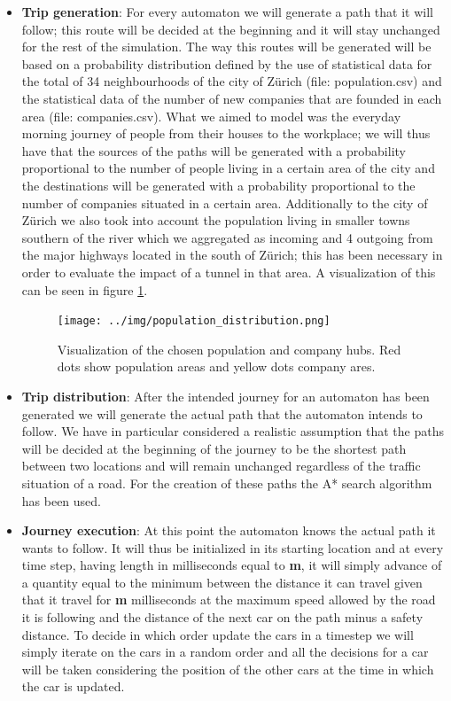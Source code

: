 \documentclass[11pt]{article}
\begin{document}
\begin{itemize}
\item \textbf{Trip generation}: For every automaton we will generate a path that it will follow; this route will be decided at the beginning and it will stay unchanged for the rest of the simulation. The way this routes will be generated will be based on a probability distribution defined by the use of statistical data\cite{ wiki:zurich} for the total of 34 neighbourhoods of the city of Z\"urich (file: population.csv) and the statistical data \cite{moneyhouse} of the number of new companies that are founded in each area (file: companies.csv). What we aimed to model was the everyday morning journey of people from their houses to the workplace; we will thus have that the sources of the paths will be generated with a probability proportional to the number of people living in a certain area of the city and the destinations will be generated with a probability proportional to the number of companies situated in a certain area. Additionally to the city of Z\"urich we also took into account the population living in smaller towns southern of the river which we aggregated as incoming and 4 outgoing from the major highways located in the south of Z\"urich; this has been necessary in order to evaluate the impact of a tunnel in that area.
A visualization of this can be seen in figure \ref{fig:pop_data}.

\begin{figure}[tbh]
	\begin{center}
		\texttt{[image: ../img/population\_distribution.png]}
	\end{center}
	\caption{Visualization of the chosen population and company hubs. Red dots show population areas and yellow dots company ares.}
	\label{fig:pop_data}
\end{figure}

\item \textbf{Trip distribution}:  After the intended journey for an automaton has been generated we will generate the actual path that the automaton intends to follow. We have in particular considered a realistic assumption that the paths will be decided at the beginning of the journey to be the shortest path between two locations and will remain unchanged regardless of the traffic situation of a road. For the creation of these paths the A* search algorithm has been used.
\item \textbf{Journey execution}: At this point the automaton knows the actual path it wants to follow. It will thus be initialized in its starting location and at every time step, having length in milliseconds equal to \textbf{m}, it will simply advance of a quantity equal to the minimum between the distance it can travel given that it travel for \textbf{m} milliseconds at the maximum speed allowed by the road it is following and the distance of the next car on the path minus a safety distance. To decide in which order update the cars in a timestep we will simply iterate on the cars in a random order and all the decisions for a car will be taken considering the position of the other cars at the time in which the car is updated.


\end{itemize}
\end{document}
